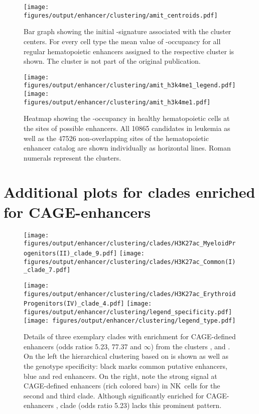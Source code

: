 \begin{figure}[!htb]
	\centering
	\texttt{[image: figures/output/enhancer/clustering/amit\_centroids.pdf]} 
	\caption{Bar graph showing the initial \hisfourone-signature associated with the cluster centers. For every cell type the mean value of \hisfourone-occupancy for all regular hematopoietic enhancers assigned to the respective cluster is shown. The \amitten cluster is not part of the original publication.}
	\label{fig:enhancers:amit_centroids}
\end{figure}

\begin{figure}[!p]
	\centering
	\texttt{[image: figures/output/enhancer/clustering/amit\_h3k4me1\_legend.pdf]} 
	\texttt{[image: figures/output/enhancer/clustering/amit\_h3k4me1.pdf]} 
	\caption{Heatmap showing the \hisfourone-occupancy in healthy hematopoietic cells at the sites of possible enhancers. All \num{10865} candidates in \mllafnine \kitpos leukemia as well as the \num{47526} non-overlapping sites of the hematopoietic enhancer catalog are shown individually as horizontal lines. Roman numerals represent the clusters.}
	\label{fig:enhancers:amit_h3k4me1}
\end{figure}
 
\FloatBarrier
\clearpage
\section{Additional plots for clades enriched for CAGE-enhancers}
\label{chap:r:enhancers:cluster:clades:healthy}
\enlargethispage{\baselineskip}
\begin{figure}[!b]
	\texttt{[image: figures/output/enhancer/clustering/clades/H3K27ac\_MyeloidProgenitors(II)\_clade\_9.pdf]}
	\texttt{[image: figures/output/enhancer/clustering/clades/H3K27ac\_Common(I)\_clade\_7.pdf]}
	\captionsetup{labelformat=empty}
	\caption{}
\end{figure}

\begin{figure}[!htb]
	\texttt{[image: figures/output/enhancer/clustering/clades/H3K27ac\_ErythroidProgenitors(IV)\_clade\_4.pdf]}
	\texttt{[image: figures/output/enhancer/clustering/legend\_specificity.pdf]}
	\texttt{[image: figures/output/enhancer/clustering/legend\_type.pdf]}
	\caption{Details of three exemplary clades with enrichment for CAGE-defined enhancers (odds ratios \num{5.23}, \num{77.37} and \ensuremath{\infty}) from the clusters \amitone, \amittwo and \amitfour. On the left the hierarchical clustering based on \histwentysevenac is shown as well as the genotype specificity: black marks common putative enhancers, blue  \dnmtwtregular and red  \dnmtchipregular enhancers. On the right, note the strong \histwentysevenac signal at CAGE-defined enhancers (rich colored bars) in NK~cells for the second and third clade. Although significantly enriched for CAGE-enhancers , clade  (odds ratio \num{5.23}) lacks this prominent pattern. }
	\label{fig:enhancers:amit_overrepresented_clades}
\end{figure}



